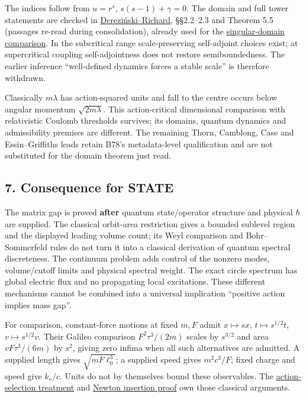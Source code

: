 \documentclass[11pt,a4paper]{article}
\begin{document}
The indices follow from \(u=r^s\), \(s(s-1)+\gamma=0\). The domain and
full tower statements are checked in
\href{https://arxiv.org/pdf/1604.03340}{Dereziński--Richard}, §§2.2--2.3
and Theorem 5.5 (passages re-read during consolidation), already used
for the \href{self-sufficiency-contrast.md}{singular-domain comparison}.
In the subcritical range scale-preserving self-adjoint choices exist; at
supercritical coupling self-adjointness does not restore
semiboundedness. The earlier inference ``well-defined dynamics forces a
stable scale'' is therefore withdrawn.

Classically \(m\lambda\) has action-squared units and fall to the centre
occurs below angular momentum \(\sqrt{2m\lambda}\). This action-critical
dimensional comparison with relativistic Coulomb thresholds survives;
its domains, quantum dynamics and admissibility premises are different.
The remaining Thorn, Camblong, Case and Essin--Griffiths leads retain
B78's metadata-level qualification and are not substituted for the
domain theorem just read.

\hypertarget{consequence-for-state}{%
\subsection{7. Consequence for STATE}\label{consequence-for-state}}

The matrix gap is proved \textbf{after} quantum state/operator structure
and physical \(\hbar\) are supplied. The classical orbit-area
restriction gives a bounded sublevel region and the displayed leading
volume count; its Weyl comparison and Bohr--Sommerfeld rules do not turn
it into a classical derivation of quantum spectral discreteness. The
continuum problem adds control of the nonzero modes, volume/cutoff
limits and physical spectral weight. The exact circle spectrum has
global electric flux and no propagating local excitations. These
different mechanisms cannot be combined into a universal implication
``positive action implies mass gap''.

For comparison, constant-force motions at fixed \(m,F\) admit
\(x\mapsto sx\), \(t\mapsto s^{1/2}t\), \(v\mapsto s^{1/2}v\). Their
Galileo comparison \(F^2\tau^3/(2m)\) scales by \(s^{3/2}\) and area
\(vF\tau^3/(6m)\) by \(s^2\), giving zero infima when all such
alternatives are admitted. A supplied length gives
\(\sqrt{mF\ell_0^3}\); a supplied speed gives \(m^2c^3/F\); fixed charge
and speed give \(k_e/c\). Units do not by themselves bound these
observables. The
\href{action-unit-dimensional-selection.md}{action-selection treatment}
and \href{newton-insertion-action.md}{Newton insertion proof} own those
classical arguments.
\end{document}
